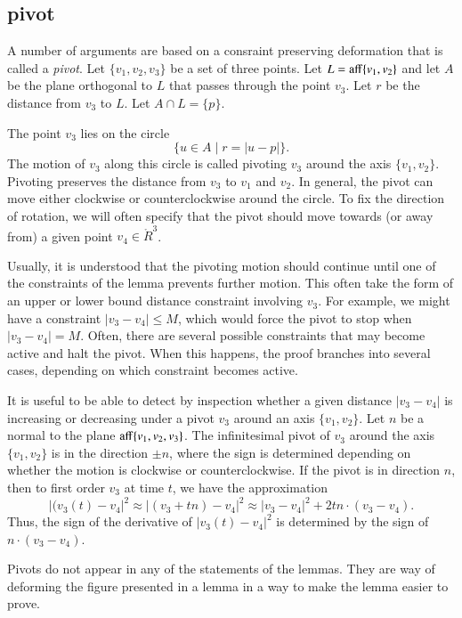 \begin{tarskidata}
\subsection{pivot}

A number of arguments are based on a consraint preserving deformation
that is called a {\it pivot}.    Let $\{v_1,v_2,v_3\}$ be a set
of three points.  Let $L={\operatorname{aff}}\{v_1,v_2\}$ and let $A$ be
the plane orthogonal to $L$ that passes through the point $v_3$.
Let $r$ be the distance from $v_3$ to $L$.  Let $A\cap L = \{p\}$.

The point $v_3$ lies on the circle
   $$
   \{u \in A \mid r = |u - p|\}.
   $$
The motion of $v_3$ along this circle is called pivoting $v_3$
around the axis $\{v_1,v_2\}$.   Pivoting preserves the distance from
$v_3$ to $v_1$ and $v_2$.   In general, the pivot can move
either clockwise or counterclockwise around the circle.  To fix
the direction of rotation, we will often specify that the pivot
should move towards (or away from) a given point $v_4\in\ring{R}^3$.



Usually, it is understood that the pivoting motion should continue
until one of the constraints of the lemma prevents further motion.
This often take the form of an upper or lower bound distance
constraint involving $v_3$.  For example, we might have a constraint
$|v_3-v_4|\le M$, which would force the pivot to stop when $|v_3-v_4|=M$.
Often, there are several possible constraints that may become active
and halt the pivot.  When this happens, the proof branches into several
cases, depending on which constraint becomes active.

It is useful to be able to detect by inspection whether a given
distance $|v_3-v_4|$ is increasing or decreasing under a pivot $v_3$
around an axis $\{v_1,v_2\}$.  Let $n$ be a normal to the plane
${\operatorname{aff}}\{v_1,v_2,v_3\}$.  The infinitesimal pivot of $v_3$ 
around the axis $\{v_1,v_2\}$ is in the direction $\pm n$, where
the sign is determined depending on whether the motion is clockwise
or counterclockwise.    If the pivot is in direction $n$, 
then to first order $v_3$ at time $t$, we have the approximation
  $$
  |(v_3(t)-v_4|^2 \approx |(v_3+t n)-v_4|^2 
  \approx |v_3-v_4|^2 + 2 t n \cdot (v_3-v_4).
  $$
Thus, the sign of the derivative of $|v_3(t)-v_4|^2$ is determined by the
sign of $n\cdot (v_3-v_4)$.


Pivots do not appear in any of the statements of the lemmas.  They
are way of deforming the figure presented in a lemma in a way to make
the lemma easier to prove.








\end{tarskidata}
